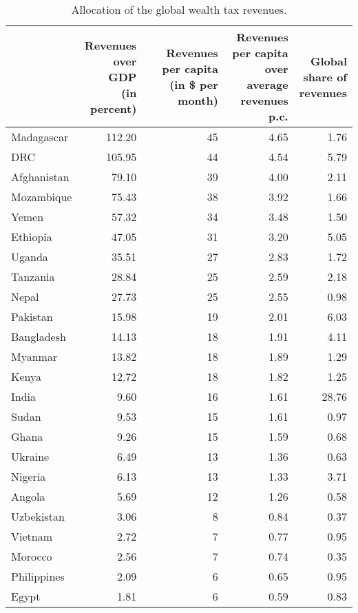 
\begin{longtable}[t]{lrrrr}
\caption{\label{tab:allocation}Allocation of the global wealth tax revenues.}\\
\toprule
  & \makecell{Revenues\\over GDP\\(in percent)} & \makecell{Revenues\\per capita\\(in \$ per month)} & \makecell{Revenues per capita\\over average\\revenues p.c.} & \makecell{Global\\share of\\revenues}\\
\midrule
Madagascar & 112.20 & 45 & 4.65 & 1.76\\
DRC & 105.95 & 44 & 4.54 & 5.79\\
Afghanistan & 79.10 & 39 & 4.00 & 2.11\\
Mozambique & 75.43 & 38 & 3.92 & 1.66\\
Yemen & 57.32 & 34 & 3.48 & 1.50\\
Ethiopia & 47.05 & 31 & 3.20 & 5.05\\
Uganda & 35.51 & 27 & 2.83 & 1.72\\
Tanzania & 28.84 & 25 & 2.59 & 2.18\\
Nepal & 27.73 & 25 & 2.55 & 0.98\\
Pakistan & 15.98 & 19 & 2.01 & 6.03\\
Bangladesh & 14.13 & 18 & 1.91 & 4.11\\
Myanmar & 13.82 & 18 & 1.89 & 1.29\\
Kenya & 12.72 & 18 & 1.82 & 1.25\\
India & 9.60 & 16 & 1.61 & 28.76\\
Sudan & 9.53 & 15 & 1.61 & 0.97\\
Ghana & 9.26 & 15 & 1.59 & 0.68\\
Ukraine & 6.49 & 13 & 1.36 & 0.63\\
Nigeria & 6.13 & 13 & 1.33 & 3.71\\
Angola & 5.69 & 12 & 1.26 & 0.58\\
Uzbekistan & 3.06 & 8 & 0.84 & 0.37\\
Vietnam & 2.72 & 7 & 0.77 & 0.95\\
Morocco & 2.56 & 7 & 0.74 & 0.35\\
Philippines & 2.09 & 6 & 0.65 & 0.95\\
Egypt & 1.81 & 6 & 0.59 & 0.83\\

\end{longtable}
